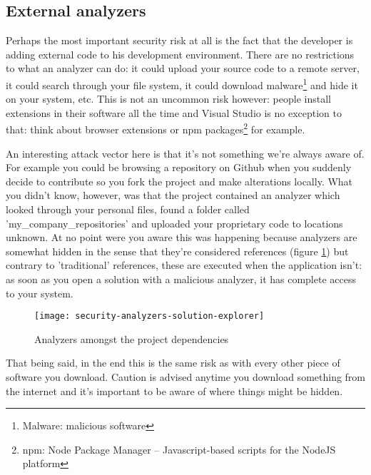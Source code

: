 \newpage
\subsection{External analyzers}
\label{sec:security-external-analyzers}

Perhaps the most important security risk at all is the fact that the developer is adding external code to his development environment. There are no restrictions to what an analyzer can do: it could upload your source code to a remote server, it could search through your file system, it could download \gls{malware}\footnote{Malware: malicious software} and hide it on your system, etc. This is not an uncommon risk however: people install extensions in their software all the time and Visual Studio is no exception to that: think about browser extensions or \gls{npm} packages\footnote{npm: Node Package Manager -- Javascript-based scripts for the NodeJS platform} for example. 

An interesting attack vector here is that it's not something we're always aware of. For example you could be browsing a repository on Github when you suddenly decide to contribute so you \gls{fork} the project and make alterations locally. What you didn't know, however, was that the project contained an analyzer which looked through your personal files, found a folder called 'my\_company\_repositories' and uploaded your proprietary code to locations unknown. At no point were you aware this was happening because analyzers are somewhat hidden in the sense that they're considered references (figure \ref{img:security-analyzers-solution-explorer}) but contrary to 'traditional' references, these are executed when the application isn't: as soon as you open a solution with a malicious analyzer, it has complete access to your system.

\begin{figure}[H]
\centering
\texttt{[image: security-analyzers-solution-explorer]}
\caption[Analyzers amongst the project dependencies]{Analyzers amongst the project dependencies}
\label{img:security-analyzers-solution-explorer}
\end{figure}

That being said, in the end this is the same risk as with every other piece of software you download. Caution is advised anytime you download something from the internet and it's important to be aware of where things might be hidden.